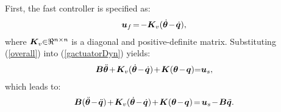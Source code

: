 \documentclass[letterpaper, 10 pt, conference]{ieeeconf}
\begin{document}
First,
the fast controller is specified as:
\begin{eqnarray}
&\bm
u_f\hspace{-0.05cm}=\hspace{-0.05cm}-\bm K_v(\dot{\bm
\theta}\hspace{-0.05cm}-\hspace{-0.05cm}\dot{\bm q}),\label{fastControl}
\end{eqnarray}
where $\bm
K_v\hspace{-0.1cm}\in\hspace{-0.1cm}\Re^{n\times n}$ is a diagonal
and positive-definite matrix. Substituting (\ref{overall}) into
(\ref{gactuatorDyn}) yields:
\begin{eqnarray}
&\bm B\ddot{\bm \theta}\hspace{-0.05cm}+\hspace{-0.05cm}\bm
K_v(\dot{\bm \theta}\hspace{-0.05cm}-\hspace{-0.05cm}\dot{\bm
q})\hspace{-0.05cm}+\hspace{-0.05cm}\bm K\hspace{-0.00cm}(\bm
\theta\hspace{-0.05cm}-\hspace{-0.05cm}\bm
q)\hspace{-0.1cm}=\hspace{-0.1cm}\bm u_s,
\end{eqnarray}
which leads to:
\begin{eqnarray}
&\bm B(\ddot{\bm \theta}\hspace{-0.05cm}-\hspace{-0.05cm}\ddot{\bm
q})\hspace{-0.05cm}+\hspace{-0.05cm}\bm K_v(\dot{\bm
\theta}\hspace{-0.05cm}-\hspace{-0.05cm}\dot{\bm
q})\hspace{-0.05cm}+\hspace{-0.05cm}\bm K\hspace{-0.00cm}(\bm
\theta\hspace{-0.05cm}-\hspace{-0.05cm}\bm
q)\hspace{-0.05cm}=\hspace{-0.05cm}\bm
u_s\hspace{-0.05cm}-\hspace{-0.05cm}\bm B\ddot{\bm q}.\label{temp11}
\end{eqnarray}
\end{document}
